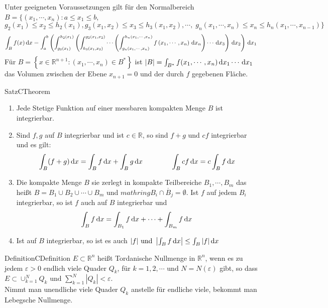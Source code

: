 Unter geeigneten Voraussetzungen gilt für den Normalbereich $ B  = \{ (x_1, \cdots,  x_n) : a \leq x_1 \leq b$,\\ $  
g_2 (x_1) \leq x_2 \leq h_2 (x_1), g_3 (x_1,x_2) \leq x_3 \leq h_3 (x_1,x_2) , \cdots, \; g_n ( x_1, \cdots,  x_n) \leq x_n \leq
h_n (x_1, \cdots,  x_{n-1})\} $ 
$$ \int_{ B } f (x) \,\mathrm{d} x = \int_{ a }^{ b } \left( \int_{ g_2 (x_1) }^{ h_2 (x_1)} \left( \int_{ h_3 (x_1,x_2) }^{ g_2 (x_1,x_2) }
\cdots \left( \int_{ g_n (x_1, \cdots, x_n)  }^{ h_n (x_1, \cdots, x_n)}  f \left( x_1, \cdots, x_n \right) \,\mathrm{d} x_n \right) 
\cdots \,\mathrm{d} x_3\right)\,\mathrm{d} x_2\right) \,\mathrm{d} x_1$$
Für $ B = \left\{ x \in \mathbb{R}^{n+1} : \left( x_1 , \cdots,  x_n \right) \in B^{*} \right\}  $ ist $ |B| = \int_{ B^{*}}
f (x_1, \cdots,  x_n) \,\mathrm{d} x_1\cdots\,\mathrm{d} x_1 $ das Volumen zwischen der Ebene $ x_{n+1} = 0 $ und der durch $ f $ gegebenen Fläche.

\begin{ibox}[56]{Satz}{CTheorem}
    \begin{enumerate}[label=\alph*)]
    	\item Jede Stetige Funktion auf einer messbaren kompakten Menge $ B $ ist integrierbar.
			\item Sind $ f, g $ auf $ B $ integrierbar und ist $ c \in \mathbb{R} $, so sind $ f + g $ und $ c f $ integrierbar
				und es gilt: 
				$$ \int_{ B } (f+g) \,\mathrm{d} x =  \int_{ B } f \,\mathrm{d} x + \int_{ B } g \,\mathrm{d} x \qquad \qquad \int_{ B } c f \,\mathrm{d} x = 
			c	\int_{ B } f \,\mathrm{d} x $$
		\item Die kompakte Menge $ B $ sie zerlegt in kompakte Teilbereiche $ B_1 , \cdots,  B_m $ das heißt $ B = B_1 \cup B_2 \cup 
			\cdots \cup B_m$ und $ mathring{B_i} \cap \mathring{B_j} = \emptyset  $. Ist $ f $ auf jedem $ B_i $ integrierbar, so ist
			$ f $ auch auf $ B $ integrierbar und
			$$
			\int_{ B } f \,\mathrm{d} x = \int_{ B_1 } f \,\mathrm{d} x +  \cdots + \int_{ B_m }f \,\mathrm{d} x
			$$
		\item Ist auf $ B $ integrierbar, so ist es auch $ |f| \text{ und }  \left| \int_{ B } f \,\mathrm{d} x  \right| \leq \int_{ B }
			|f| \,\mathrm{d} x$ 
    \end{enumerate}
\end{ibox}
\begin{ibox}[]{Definition}{CDefinition}
    $ E \subset \mathbb{R}^n $ heißt Tordanische Nullmenge in $ \mathbb{R}^n $, wenn es zu jedem $ \varepsilon > 0  $ endlich
		viele Quader $ Q_k $, für $ k = 1, 2 , \cdots \text{ und } N = N (\varepsilon) $ gibt, so dass $ E \subset \cup_{k=1}^{N} Q_k
		\text{ und }  \sum_{k=1}^{N}|Q_k| < \varepsilon$. \\
		 Nimmt man unendliche viele Quader $ Q_k $ anstelle für endliche viele, bekommt man Lebegsche Nullmenge.
\end{ibox}
%

